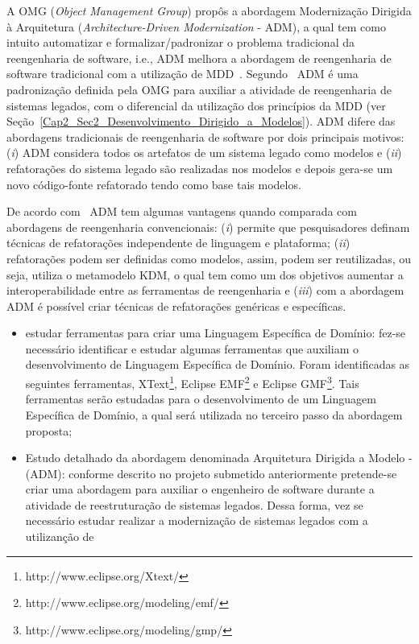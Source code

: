 A OMG (\textit{Object Management Group}) propôs a abordagem Modernização Dirigida à Arquitetura (\textit{Architecture-Driven Modernization} - ADM), a qual tem como intuito automatizar e formalizar/padronizar o problema tradicional da reengenharia de software, i.e., ADM melhora a abordagem  de reengenharia de software tradicional com a utilização de MDD~\cite{PerezCastillo:2011jo}. Segundo~\citet{rezCastillo:2011gm} ADM é uma padronização definida pela OMG para auxiliar a atividade de reengenharia de sistemas legados, com o diferencial da utilização dos princípios da MDD (ver Seção~\ref{Cap2_Sec2_Desenvolvimento_Dirigido_a_Modelos}). ADM difere das abordagens tradicionais de reengenharia de software por dois principais motivos: (\textit{i}) ADM considera todos os artefatos de um sistema legado como modelos e (\textit{ii}) refatorações do sistema legado são realizadas nos modelos e depois gera-se um novo código-fonte refatorado tendo como base tais modelos. 

De acordo com~\citet{PerezCastillo:2011jo} ADM tem algumas vantagens quando comparada com abordagens de reengenharia convencionais: (\textit{i}) permite que pesquisadores definam técnicas de refatorações independente de linguagem e plataforma; (\textit{ii}) refatorações podem ser definidas como modelos, assim, podem ser reutilizadas, ou seja, utiliza o metamodelo KDM, o qual tem como um dos objetivos aumentar a interoperabilidade entre as ferramentas de reengenharia e (\textit{iii}) com a abordagem ADM é possível criar técnicas de refatorações genéricas e específicas. 


\begin{itemize}

\item estudar ferramentas para criar uma Linguagem Específica de Domínio: fez-se necessário identificar e estudar algumas ferramentas que auxiliam o desenvolvimento de Linguagem Específica de Domínio. Foram identificadas as seguintes ferramentas, XText\footnote{http://www.eclipse.org/Xtext/}, Eclipse EMF\footnote{http://www.eclipse.org/modeling/emf/} e Eclipse GMF\footnote{http://www.eclipse.org/modeling/gmp/}. Tais ferramentas serão estudadas para o desenvolvimento de um Linguagem Específica de Domínio, a qual será utilizada no terceiro passo da abordagem proposta;

\item Estudo detalhado da abordagem denominada Arquitetura Dirigida a Modelo - (ADM): conforme descrito no projeto submetido anteriormente pretende-se criar uma abordagem para auxiliar o engenheiro de software durante a atividade de reestruturação de sistemas legados. Dessa forma, vez se necessário estudar realizar a modernização de sistemas legados com a utilizanção de 

\end{itemize}
